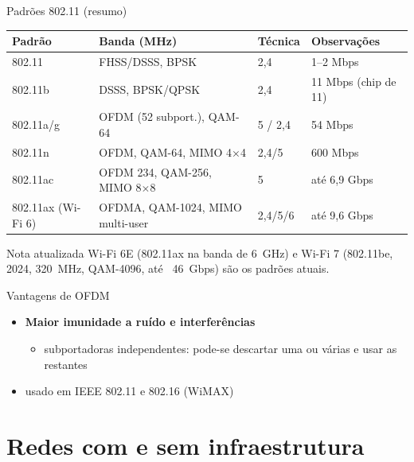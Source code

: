 \documentclass[aspectratio=169,11pt]{beamer}
\begin{document}
\begin{frame}{Padrões 802.11 (resumo)}
  \begin{center}
    \scriptsize
    \begin{tabular}{@{}llll@{}}
      \toprule
      \textbf{Padrão} & \textbf{Banda (MHz)} & \textbf{Técnica} & \textbf{Observações}\\
      \midrule
      802.11 & FHSS/DSSS, BPSK & 2,4 & 1--2 Mbps\\
      802.11b & DSSS, BPSK/QPSK & 2,4 & 11 Mbps (chip de 11)\\
      802.11a/g & OFDM (52 subport.), QAM-64 & 5 / 2,4 & 54 Mbps\\
      802.11n & OFDM, QAM-64, MIMO 4$\times$4 & 2,4/5 & 600 Mbps\\
      802.11ac & OFDM 234, QAM-256, MIMO 8$\times$8 & 5 & até 6,9 Gbps\\
      802.11ax (Wi-Fi 6) & OFDMA, QAM-1024, MIMO multi-user & 2,4/5/6 & até 9,6 Gbps\\
      \bottomrule
    \end{tabular}
  \end{center}
  \vspace{0.2cm}
  \begin{alertblock}{Nota atualizada}
    Wi-Fi 6E (802.11ax na banda de 6~GHz) e Wi-Fi 7 (802.11be, 2024, 320~MHz, QAM-4096, até ~46~Gbps) são os padrões atuais.
  \end{alertblock}
\end{frame}

\begin{frame}{Vantagens de OFDM}
  \begin{itemize}
    \item \textbf{Maior imunidade a ruído e interferências}
      \begin{itemize}
        \item subportadoras independentes: pode-se descartar uma ou várias e usar as restantes
      \end{itemize}
    \item usado em IEEE 802.11 e 802.16 (WiMAX)
  \end{itemize}
\end{frame}

\section{Redes com e sem infraestrutura}
\end{document}
